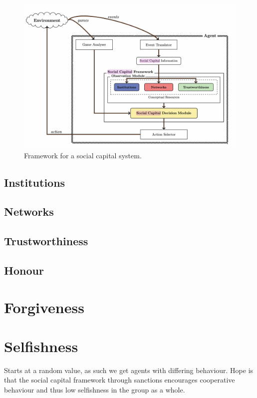 \begin{figure}[!h]
    \centering
    \includegraphics[width=0.75\linewidth]{004_team_1_agent_design/images/socialcapitalframework.png}
    \caption{Framework for a social capital system.\cite{pitt}}
    \label{fig:social_capital_framework}
\end{figure}

\subsection{Institutions}

\subsection{Networks}

\subsection{Trustworthiness}

\subsection{Honour}
\label{subsection:honour}

\section{Forgiveness}

\section{Selfishness}

Starts at a random value, as such we get agents with differing behaviour. Hope is that the social capital framework through sanctions encourages cooperative behaviour and thus low selfishness in the group as a whole.

